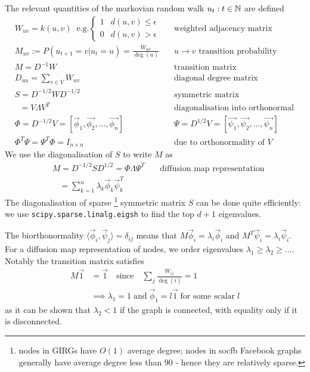 The relevant quantities of the markovian random walk $u_t : t \in \mathbb{N}$ are defined
\begin{align*}
  & W_{uv} = k(u, v) \;\; \text{e.g.} \begin{cases}1 & d(u,v) \leq \epsilon \\0 & d(u,v) > \epsilon \end{cases} & \text{weighted adjacency matrix}
  \\
  & M_{uv} := P(u_{t+1} = v | u_t=u) = \frac{W_{uv}}{\deg(u)}
  \quad & \text{$u \to v$ transition probability}
  \\
  & M = D^{-1}W \quad & \text{transition matrix}\\
  & D_{uu} = \sum_{v\in V} W_{uv} \quad & \text{diagonal degree matrix}\\
  & S = D^{-1/2} W D^{-1/2} \quad & \text{symmetric matrix}\\
  & \;\; = V \Lambda V^T \quad & \text{diagonalisation into orthonormal e-vectors}\\
  & \Phi = D^{-1/2} V = [\vec{\phi}_1, \vec{\phi_2}, ..., \vec{\phi_n}] \quad & \Psi = D^{1/2} V = [\vec{\psi_1}, \vec{\psi_2}, ..., \vec{\psi_n}]\\
  & \Phi^T \Psi = \Psi^T \Phi = I_{n \times n} \quad & \text{due to orthonormality of $V$}
\end{align*}
%
We use the diagonalisation of $S$ to write $M$ as 
\begin{align*}
  & M = D^{-1/2} S D^{1/2} = \Phi \Lambda \Psi^T \quad & \text{diffusion map representation}\\
  & \;\;\; = \sum_{k=1}^n \lambda_k \vec{\phi}_k \vec{\psi}_k^T &
\end{align*}
%
The diagonalisation of sparse
\footnote{nodes in GIRGs have $O(1)$ average degree; nodes in socfb Facebook graphs generally have average degree less than $90$ - hence they are relatively sparse.}
symmetric matrix $S$ can be done quite efficiently: 
we use \verb+scipy.sparse.linalg.eigsh+ to find the top $d+1$ eigenvalues.

The biorthonormality $\langle \vec{\phi}_i, \vec{\psi}_j \rangle = \delta_{ij}$ means that $M \vec{\phi}_i = \lambda_i \vec{\phi}_i$ and $M^T \vec{\psi}_i = \lambda_i \vec{\psi}_i$. For a diffusion map representation of nodes, we order eigenvalues $\lambda_1 \geq \lambda_2 \geq ...$.
Notably the transition matrix satisfies 
\begin{align}
M\vec{1} &= \vec{1} \quad \text{since}\quad \sum_j \frac{W_{ij}}{\deg(i)} = 1
\\
&\implies \lambda_1 = 1\; \text{and} \; \vec{\phi}_1 = l \vec{1} \;\text{for some scalar}\; l
\end{align}
as it can be shown that $\lambda_2 < 1$ if the graph is connected, with equality only if it is disconnected.

